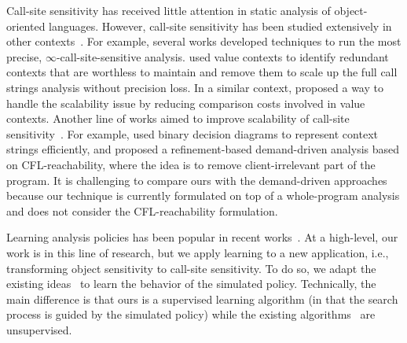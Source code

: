 Call-site sensitivity has received little attention in static analysis of object-oriented languages. 
However, call-site sensitivity has been studied extensively in other contexts~\cite{Thakur2019,Oh2014, Khedker2008,Khedker2012,Zhang2014, Sridharan2006,Sridharan2005,Dan17,Tripp2009}.
For example, several works developed techniques to run the most precise, 
$\infty$-call-site-sensitive analysis.
\citet{Khedker2008} used value contexts to identify 
redundant contexts that are worthless to maintain and remove them
to scale up the full call strings analysis without precision loss.
In a similar context, \citet{Thakur2019} proposed a way to handle the scalability issue by reducing
comparison costs involved in value contexts.
Another line of works aimed to improve scalability of call-site
sensitivity~\cite{Whaley2004,Sridharan2006,Sridharan2005,Dan17,Xu2009}.
For example, \citet{Whaley2004} used binary decision diagrams to represent context strings efficiently, and 
\citet{Sridharan2006} proposed a refinement-based demand-driven
analysis based on CFL-reachability, where the idea is to remove client-irrelevant part of the program.
It is challenging to compare ours with the demand-driven approaches~\cite{Sridharan2006,Boomerang16} because our technique is currently formulated on top of a whole-program analysis and does not consider the CFL-reachability formulation. 

Learning analysis policies has been popular in recent 
works~\cite{Bielik2017,Peleg2016,Oh2015,JeJeChOh17,Jeon2019,Singh2018cav,heo2017unsound,Heo2019resource,Grigore2016,He2020,WeiR15,Graphick20}.
At a high-level, our work is in this line of research, but we apply learning to a new application, i.e., transforming object sensitivity to call-site sensitivity. 
To do so, we adapt the existing
ideas~\cite{JeJeChOh17,JeJeOh18} to learn the behavior of the simulated
policy.  Technically, the main difference is that ours is a supervised learning
algorithm (in that the search process is guided by the simulated policy) while the existing
algorithms~\cite{JeJeChOh17,JeJeOh18} are unsupervised.


